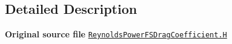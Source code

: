 \subsection{Detailed Description}
{\bfseries Original source file} \href{../../../home/carlo/data/GeN-Foam/GeN-Foam_ffn/GeN-Foam/GeN-Foam/classes/thermalHydraulics/src/physicsModels/dragModels/FSDragCoefficientModels/ReynoldsPower/ReynoldsPowerFSDragCoefficient.H}{\tt Reynolds\+Power\+F\+S\+Drag\+Coefficient.\+H} 